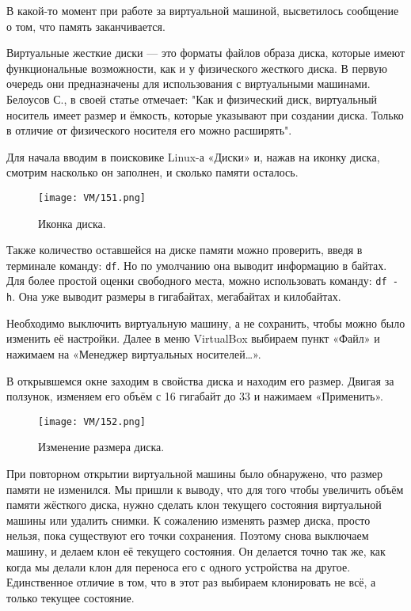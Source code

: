 В какой-то момент при работе за виртуальной машиной, высветилось сообщение о том, что память заканчивается. 

Виртуальные жесткие диски — это форматы файлов образа диска, которые имеют функциональные возможности, как и у физического жесткого диска. В первую очередь они предназначены для использования с виртуальными машинами. Белоусов С., в своей статье отмечает: "Как и физический диск, виртуальный носитель имеет размер и ёмкость, которые указывают при создании диска. Только в отличие от физического носителя его можно расширять".

Для начала вводим в поисковике Linux-а «Диски» и, нажав на иконку диска, смотрим насколько он заполнен, и сколько памяти осталось. 

\begin{figure}[h]
		\centering
		\texttt{[image: VM/151.png]}
\caption{Иконка диска.}
\label{ris:image}
\end{figure}

Также количество оставшейся на диске памяти можно проверить, введя в терминале команду: \texttt{df}. Но по умолчанию она выводит информацию в байтах. Для более простой оценки свободного места, можно использовать команду: \texttt{df -h}. Она уже выводит размеры в гигабайтах, мегабайтах и килобайтах.

Необходимо выключить виртуальную машину, а не сохранить, чтобы можно было изменить её настройки. Далее в меню VirtualBox выбираем пункт «Файл» и нажимаем на «Менеджер виртуальных носителей…».

В открывшемся окне заходим в свойства диска и находим его размер. Двигая за ползунок, изменяем его объём с 16 гигабайт до 33 и нажимаем «Применить». 

\begin{figure}[h]
		\centering
		\texttt{[image: VM/152.png]}
\caption{Изменение размера диска.}
\label{ris:image}
\end{figure}

При повторном открытии виртуальной машины было обнаружено, что размер памяти не изменился. Мы пришли к выводу, что для того чтобы увеличить объём памяти жёсткого диска, нужно сделать клон текущего состояния виртуальной машины или удалить снимки. К сожалению изменять размер диска, просто нельзя, пока существуют его точки сохранения. Поэтому снова выключаем машину, и делаем клон её текущего состояния. Он делается точно так же, как когда мы делали клон для переноса его с одного устройства на другое. Единственное отличие в том, что в этот раз выбираем клонировать не всё, а только текущее состояние. 

